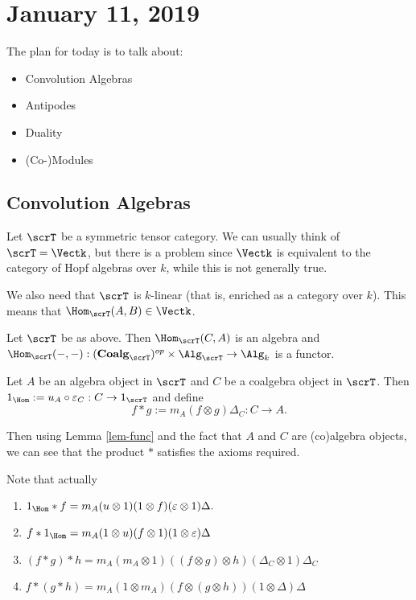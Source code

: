 \documentclass[12pt]{article}
\newcommand*{\Coalg}{\mathbf{Coalg}}
\begin{document}
\section{January 11, 2019}
The plan for today is to talk about:
\begin{itemize}
	\item Convolution Algebras
	\item Antipodes
	\item Duality
	\item (Co-)Modules
\end{itemize}

\subsection{Convolution Algebras}
 Let $\scrT$ be a symmetric tensor category. We can usually think of $\scrT=\Vectk$, but 
 there is a problem since $\Vectk$ is equivalent to the category of Hopf algebras over $k$,
 while this is not generally true.

 We also need that $\scrT$ is $k$-linear (that is, enriched as a category over $k$). This
 means that $\Hom_\scrT (A,B)\in\Vectk$.

 \begin{thm}
	Let $\scrT$ be as above. Then $\Hom_\scrT(C,A)$ is an algebra and $\Hom_\scrT(-,-):(\Coalg_\scrT)^{op}\times\Alg_\scrT\to\Alg_k$
	is a functor.
 \end{thm}
 \begin{prf}
	Let $A$ be an algebra object in $\scrT$ and $C$ be a coalgebra object in $\scrT$. Then $1_{\Hom} :=u_A\circ\varepsilon_C:C\to 1_\scrT$ and define
	\[f\ast g := m_A(f\otimes g)\Delta_C:C\to A.\]

	Then using Lemma \ref{lem-func} and the fact that $A$ and $C$ are (co)algebra objects,
	we can see that the product $\ast$ satisfies the axioms required.

	Note that actually
 \end{prf}
 \begin{lem}
	\begin{enumerate}
		\item $1_{\Hom}\ast f = m_A(u\otimes 1)(1\otimes f)(\varepsilon\otimes 1)\Delta.$
		\item $f\ast 1_{\Hom}=m_A(1\otimes u)(f\otimes 1)(1\otimes \varepsilon)\Delta$
		\item $(f\ast g)\ast h=m_A(m_A\otimes 1)((f\otimes g)\otimes h)(\Delta_C\otimes 1)\Delta_C$
		\item $f\ast(g\ast h)=m_A(1\otimes m_A)(f\otimes(g\otimes h))(1\otimes \Delta)\Delta$
	\end{enumerate}
	\label{lem-func}
 \end{lem}
 
\end{document}
